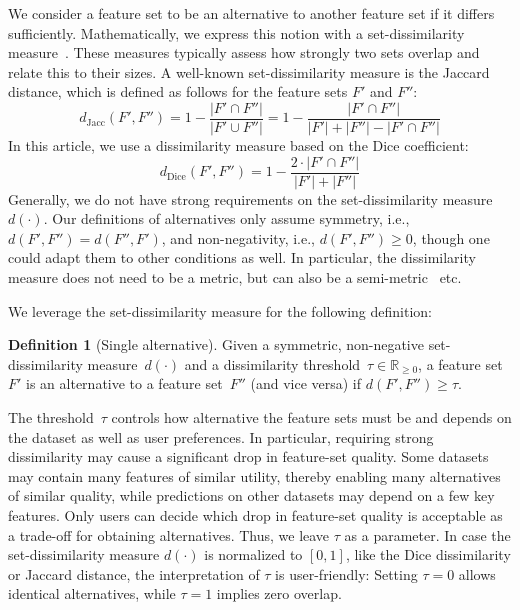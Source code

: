\documentclass{article}
\theoremstyle{definition}
\newtheorem{definition}[proposition]{Definition} %
\begin{document}
We consider a feature set to be an alternative to another feature set if it differs sufficiently.
Mathematically, we express this notion with a set-dissimilarity measure~\cite{choi2010survey, egghe2009new}.
These measures typically assess how strongly two sets overlap and relate this to their sizes.
A well-known set-dissimilarity measure is the Jaccard distance, which is defined as follows for the feature sets $F'$ and $F''$:
%
\begin{equation}
	d_{\text{Jacc}}(F',F'') = 1 - \frac{|F' \cap F''|}{|F' \cup F''|} = 1 - \frac{|F' \cap F''|}{|F'| + |F''| - |F' \cap F''|}
	\label{eq:afs:jaccard}
\end{equation}
%
In this article, we use a dissimilarity measure based on the Dice coefficient:
%
\begin{equation}
	d_{\text{Dice}}(F',F'') = 1 - \frac{2 \cdot |F' \cap F''|}{|F'| + |F''|}
	\label{eq:afs:dice}
\end{equation}
%
Generally, we do not have strong requirements on the set-dissimilarity measure~$d(\cdot)$.
Our definitions of alternatives only assume symmetry, i.e., $d(F',F'')=d(F'',F')$, and non-negativity, i.e., $d(F',F'') \geq 0$, though one could adapt them to other conditions as well.
In particular, the dissimilarity measure does not need to be a metric, but can also be a semi-metric~\cite{wilson1931semi} etc.

We leverage the set-dissimilarity measure for the following definition:
%
\begin{definition}[Single alternative]
	Given a symmetric, non-negative set-dissimi\-larity measure~$d(\cdot)$ and a dissimilarity threshold~$\tau \in \mathbb{R}_{\geq 0}$, a feature set $F'$ is an alternative to a feature set~$F''$ (and vice versa) if $d(F',F'') \geq \tau$.
	\label{def:afs:single-alternative}
\end{definition}
%
The threshold~$\tau$ controls how alternative the feature sets must be and depends on the dataset as well as user preferences.
In particular, requiring strong dissimilarity may cause a significant drop in feature-set quality.
Some datasets may contain many features of similar utility, thereby enabling many alternatives of similar quality, while predictions on other datasets may depend on a few key features.
Only users can decide which drop in feature-set quality is acceptable as a trade-off for obtaining alternatives.
Thus, we leave $\tau$ as a parameter.
In case the set-dissimilarity measure $d(\cdot)$ is normalized to $[0,1]$, like the Dice dissimilarity or Jaccard distance, the interpretation of $\tau$ is user-friendly:
Setting $\tau=0$ allows identical alternatives, while $\tau=1$ implies zero overlap.
\end{document}
